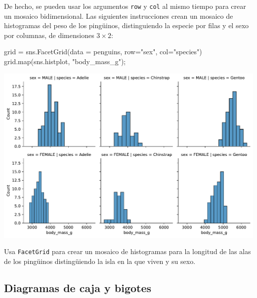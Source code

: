 \documentclass[
  a4paper,
  noprof,
  12pt,
  notoc,
  nosols,
  nobib]{mnye}
\newenvironment{Shaded}{\begin{snugshade}}{\end{snugshade}}
\newcommand{\BuiltInTok}[1]{\textcolor[rgb]{0.00,0.23,0.31}{#1}}
\newcommand{\NormalTok}[1]{\textcolor[rgb]{0.00,0.23,0.31}{#1}}
\newcommand{\OperatorTok}[1]{\textcolor[rgb]{0.37,0.37,0.37}{#1}}
\newcommand{\StringTok}[1]{\textcolor[rgb]{0.13,0.47,0.30}{#1}}
\renewenvironment{exercise}[1][]{
            \if\relax\detokenize{#1}\relax
                \ex
            \else
                \ex[note={#1}]
            \fi
        }{\endex}
\theoremstyle{definition}
\newtheorem{exercise}{Ejercicio}[section]
\theoremstyle{remark}
\begin{document}
De hecho, se pueden usar los argumentos \texttt{row} y \texttt{col} al
mismo tiempo para crear un mosaico bidimensional. Las siguientes
instrucciones crean un mosaico de histogramas del peso de los pingüinos,
distinguiendo la especie por filas y el sexo por columnas, de
dimensiones \(3 \times 2\):

\begin{Shaded}
\begin{Highlighting}[]
\NormalTok{grid }\OperatorTok{=}\NormalTok{ sns.FacetGrid(data }\OperatorTok{=}\NormalTok{ penguins, row}\OperatorTok{=}\StringTok{"sex"}\NormalTok{, col}\OperatorTok{=}\StringTok{"species"}\NormalTok{)}
\NormalTok{grid.}\BuiltInTok{map}\NormalTok{(sns.histplot, }\StringTok{"body\_mass\_g"}\NormalTok{)}\OperatorTok{;}
\end{Highlighting}
\end{Shaded}

\includegraphics{chapters/numerical_by_categorical_files/figure-pdf/cell-10-output-1.pdf}

\begin{exercise}[]%
\protect\hypertarget{exr-FacetGrid-3x2}{}\label{exr-FacetGrid-3x2}%
Usa \texttt{FacetGrid} para crear un mosaico de histogramas para la
longitud de las alas de los pingüinos distingüiendo la isla en la que
viven y su sexo.

\end{exercise}

\subsection{Diagramas de caja y
bigotes}\label{diagramas-de-caja-y-bigotes}
\end{document}
